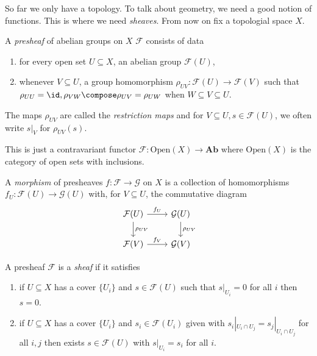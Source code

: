 \documentclass[a4paper]{article}
\renewcommand{\c}[1]{\mathbf{#1}} %
\newcommand{\sh}[1]{\mathcal{#1}} %
\begin{document}
So far we only have a topology. To talk about geometry, we need a good notion of functions. This is where we need \emph{sheaves}. From now on fix a topologial space \(X\).

\begin{definition}[presheaf]
  A \emph{presheaf} of abelian groups on \(X\) \(\sh F\) consists of data
  \begin{enumerate}
  \item for every open set \(U \subseteq X\), an abelian group \(\sh F(U)\),
  \item whenever \(V \subseteq U\), a group homomorphism \(\rho_{UV}: \sh F(U) \to \sh F(V)\) such that \(\rho_{UU} = \id, \rho_{VW} \compose \rho_{UV} = \rho_{UW}\) when \(W \subseteq V \subseteq U\).
  \end{enumerate}
\end{definition}

The maps \(\rho_{UV}\) are called the \emph{restriction maps} and for \(V \subseteq U, s \in \sh F(U)\), we often write \(s|_V\) for \(\rho_{UV}(s)\).

\begin{remark}
  This is just a contravariant functor \(\sh F: \text{Open}(X) \to \c{Ab}\) where \(\text{Open}(X)\) is the category of open sets with inclusions.
\end{remark}

\begin{definition}
  A \emph{morphism} of presheaves \(f: \sh F \to \sh G\) on \(X\) is a collection of homomorphisms \(f_U: \sh F(U) \to \sh G(U)\) with, for \(V \subseteq U\), the commutative diagram
  \[
    \begin{tikzcd}
      \sh F(U) \ar[r, "f_U"] \ar[d, "\rho_{UV}"] & \sh G(U) \ar[d, "\rho_{UV}"] \\
      \sh F(V) \ar[r, "f_V"] & \sh G(V)
    \end{tikzcd}
  \]
\end{definition}

\begin{definition}[sheaf]
  A presheaf \(\sh F\) is a \emph{sheaf} if it satisfies
  \begin{enumerate}
  \item if \(U \subseteq X\) has a cover \(\{U_i\}\) and \(s \in \sh F(U)\) such that \(s|_{U_i} = 0\) for all \(i\) then \(s = 0\).
  \item if \(U \subseteq X\) has a cover \(\{U_i\}\) and \(s_i \in \sh F(U_i)\) given with \(s_i|_{U_i \cap U_j} = s_j|_{U_i \cap U_j}\) for all \(i, j\) then exists \(s \in \sh F(U)\) with \(s|_{U_i} = s_i\) for all \(i\).
  \end{enumerate}
\end{definition}
\end{document}
